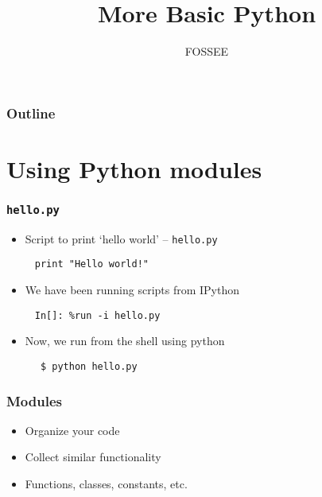 \documentclass[12pt,presentation]{beamer}
\title{More Basic Python}
\author[FOSSEE] {FOSSEE}
\institute[IIT Bombay] {Department of Aerospace Engineering\\IIT Bombay}
\date []{}
\begin{document}
\maketitle

\begin{frame}
\frametitle{Outline}
\setcounter{tocdepth}{3}
\tableofcontents
\end{frame}

\section{Using Python modules}

\begin{frame}[fragile]
  \frametitle{\texttt{hello.py}}
    \begin{itemize}
    \item Script to print `hello world' -- \texttt{hello.py}
    \end{itemize}
    \begin{lstlisting}
     print "Hello world!"
    \end{lstlisting}
    \begin{itemize}
    \item We have been running scripts from IPython
    \end{itemize}
    \begin{lstlisting}
     In[]: %run -i hello.py
    \end{lstlisting}
    \begin{itemize}
    \item Now, we run from the shell using python
    \end{itemize}
    \begin{lstlisting}
      $ python hello.py
    \end{lstlisting} 
\end{frame}


\begin{frame}
  \frametitle{Modules}
  \begin{itemize}
      \item Organize your code
      \item Collect similar functionality
      \item Functions, classes, constants, etc.
  \end{itemize}
\end{frame}
\end{document}
